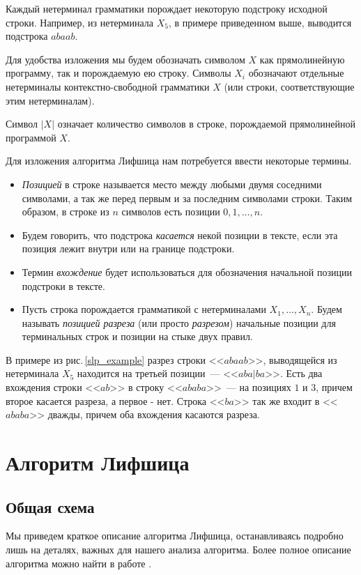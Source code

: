 \documentclass[14pt]{article}
\begin{document}
Каждый нетерминал грамматики порождает некоторую подстроку исходной строки. Например, из нетерминала $X_5$, в примере приведенном выше, выводится подстрока $abaab$.

Для удобства изложения мы будем обозначать символом $X$ как прямолинейную программу, так и порождаемую ею строку. Символы $X_i$ обозначают отдельные нетерминалы контекстно-свободной грамматики $X$ (или строки, соответствующие этим нетерминалам). 

Символ $|X|$ означает количество символов в строке, порождаемой прямолинейной программой $X$.

Для изложения алгоритма Лифшица нам потребуется ввести некоторые термины. 

\begin{itemize}

\item \emph{Позицией} в строке называется место между любыми двумя соседними символами, а так же перед первым и за последним символами строки.
Таким образом, в строке из $n$ символов есть позиции $0,1,\dots,n$.

\item Будем говорить, что подстрока \emph{касается} некой позиции в тексте, если эта позиция лежит внутри или на границе подстроки.

\item Термин \emph{вхождение} будет использоваться для обозначения начальной позиции подстроки в тексте. 

\item Пусть строка порождается грамматикой с нетерминалами $X_1, \dots, X_n$. Будем называть \emph{позицией разреза} (или просто \emph{разрезом})  
начальные позиции для терминальных строк и позиции на стыке двух правил. 

\end{itemize}

В примере из рис.\,\ref{slp_example} разрез строки <<$abaab$>>, выводящейся из нетерминала $X_5$ находится на 
третьей позиции~--- <<$aba|ba$>>. Есть два вхождения строки <<$ab$>> в строку <<$ababa$>>~--- на позициях $1$ и $3$, причем второе касается разреза, а первое - нет. Строка <<$ba$>> так же входит в <<$ababa$>> дважды, причем оба вхождения касаются разреза.

\section{Алгоритм Лифшица}
\subsection{Общая схема}
Мы приведем краткое описание алгоритма Лифшица, останавливаясь подробно лишь на деталях, важных для нашего анализа алгоритма. Более полное описание алгоритма можно найти в работе \cite{Lifshits}.
             
\end{document}
